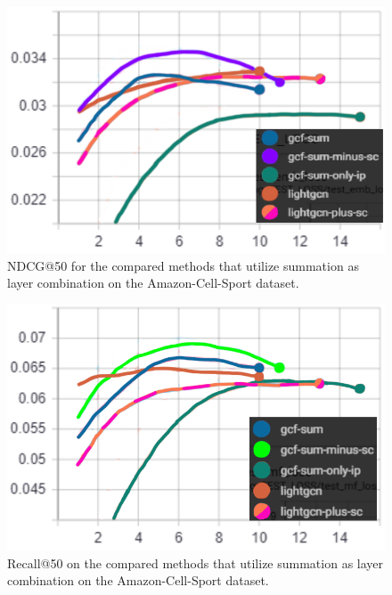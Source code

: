 \begin{figure}[h!]
    \includegraphics[width=\linewidth]{figures/amazon-cell-sport-gcf-sum-ndcg.png}
    \caption{NDCG@50 for the compared methods that utilize summation as layer combination on the Amazon-Cell-Sport dataset.}
    \label{fig:GCF-sum-NDCG-ablation-study-Amazon-Cell-Sport}
\end{figure}
\begin{figure}[h!]
    \includegraphics[width=\linewidth]{figures/amazon-cell-sport-gcf-sum-recall.png}
    \caption{Recall@50 on the compared methods that utilize summation as layer combination on the Amazon-Cell-Sport dataset.}
    \label{fig:GCF-sum-recall-ablation-study-Amazon-Cell-Sport}
\end{figure}
